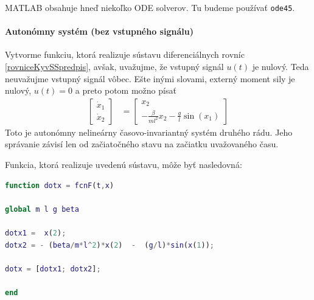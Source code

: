 \documentclass[a4paper, 10pt, ]{article}
\begin{document}
MATLAB obsahuje hneď niekoľko ODE solverov. Tu budeme používať \verb|ode45|.


\paragraph{Autonómny systém (bez vstupného signálu)}

Vytvorme funkciu, ktorá realizuje sústavu diferenciálnych rovníc \eqref{rovniceKyvSSpredpis}, avšak, uvažujme, že vstupný signál $u(t)$ je nulový. Teda neuvažujme vstupný signál vôbec. Ešte inými slovami, externý moment sily je nulový, $u(t) = 0$ a preto potom možno písať
\begin{align} \label{fajnVektRov0}
	\begin{bmatrix}
		\dot{x}_1 \\ \dot{x}_2
	\end{bmatrix}
	&=
	\begin{bmatrix}
		x_2 \\ - \frac{\beta}{ml^2} x_2 - \frac{g}{l} \sin(x_1)
	\end{bmatrix}
\end{align}
Toto je autonómny nelineárny časovo-invariantný systém druhého rádu. Jeho správanie závisí len od začiatočného stavu na začiatku uvažovaného času.

Funkcia, ktorá realizuje uvedenú sústavu, môže byť nasledovná:

\lstset{style=mystyle}
\begin{lstlisting}[language=Matlab, title=Funkcia \texttt{fcnF} (napr. v samostatnom súbore fcnF.m)]
function dotx = fcnF(t,x)

global m l g beta

dotx1 =  x(2);
dotx2 = - (beta/m*l^2)*x(2)  -  (g/l)*sin(x(1));

dotx = [dotx1; dotx2];

end
\end{lstlisting}
\end{document}
